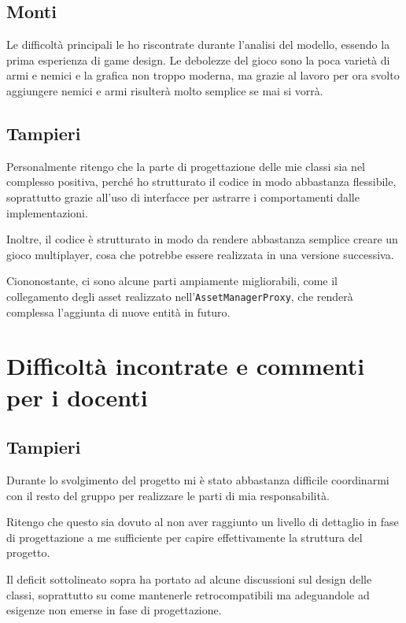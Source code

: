 \documentclass[a4paper,12pt]{report}
\begin{document}
    \subsection{Monti}
    Le difficoltà principali le ho riscontrate durante l'analisi del modello, essendo la prima esperienza di game design.
    Le debolezze del gioco sono la poca varietà di armi e nemici e la grafica non troppo moderna, ma grazie al lavoro per ora svolto
    aggiungere nemici e armi risulterà molto semplice se mai si vorrà.
    \subsection{Tampieri}
    \par Personalmente ritengo che la parte di progettazione delle mie classi sia nel complesso positiva, perché
    ho strutturato il codice in modo abbastanza flessibile, soprattutto grazie all'uso di interfacce per astrarre
    i comportamenti dalle implementazioni.
    \par Inoltre, il codice è strutturato in modo da rendere abbastanza semplice creare un gioco multiplayer, cosa
    che potrebbe essere realizzata in una versione successiva.
    \par Ciononostante, ci sono alcune parti ampiamente migliorabili, come il collegamento degli asset realizzato
    nell'\texttt{AssetManagerProxy}, che renderà complessa l'aggiunta di nuove entità in futuro.
    \section{Difficoltà incontrate e commenti per i docenti}
    \subsection{Tampieri}
    \par Durante lo svolgimento del progetto mi è stato abbastanza difficile coordinarmi con il resto del gruppo per
    realizzare le parti di mia responsabilità.
    \par Ritengo che questo sia dovuto al non aver raggiunto un livello di dettaglio in fase di progettazione a me
    sufficiente per capire effettivamente la struttura del progetto.
    \par Il deficit sottolineato sopra ha portato ad alcune discussioni sul design delle classi, soprattutto su come
    mantenerle retrocompatibili ma adeguandole ad esigenze non emerse in fase di progettazione.
    \appendix
\end{document}
